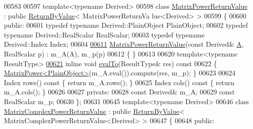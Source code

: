 \begin{DoxyCode}
00583 
00597 \textcolor{keyword}{template}<\textcolor{keyword}{typename} Derived>
00598 \textcolor{keyword}{class }\hyperlink{class_eigen_1_1_matrix_power_return_value}{MatrixPowerReturnValue} : \textcolor{keyword}{public} \hyperlink{group___core___module_class_eigen_1_1_return_by_value}{ReturnByValue}< MatrixPowerReturnVa
      lue<Derived> >
00599 \{
00600   \textcolor{keyword}{public}:
00601     \textcolor{keyword}{typedef} \textcolor{keyword}{typename} Derived::PlainObject PlainObject;
00602     \textcolor{keyword}{typedef} \textcolor{keyword}{typename} Derived::RealScalar RealScalar;
00603     \textcolor{keyword}{typedef} \textcolor{keyword}{typename} Derived::Index Index;
00604 
\hyperlink{class_eigen_1_1_matrix_power_return_value_a3067e09b352f967a23bb2a9c50afee88}{00611}     \hyperlink{class_eigen_1_1_matrix_power_return_value_a3067e09b352f967a23bb2a9c50afee88}{MatrixPowerReturnValue}(\textcolor{keyword}{const} Derived& \hyperlink{group___core___module_class_eigen_1_1_matrix}{A}, RealScalar p) : m\_A(A), m\_p(p)
00612     \{ \}
00613 
00620     \textcolor{keyword}{template}<\textcolor{keyword}{typename} ResultType>
\hyperlink{class_eigen_1_1_matrix_power_return_value_acdef58da9a4bcd2ec70260e73ce31973}{00621}     \textcolor{keyword}{inline} \textcolor{keywordtype}{void} \hyperlink{class_eigen_1_1_matrix_power_return_value_acdef58da9a4bcd2ec70260e73ce31973}{evalTo}(ResultType& res)\textcolor{keyword}{ const}
00622 \textcolor{keyword}{    }\{ \hyperlink{class_eigen_1_1_matrix_power}{MatrixPower<PlainObject>}(m\_A.eval()).compute(res, m\_p); \}
00623 
00624     Index rows()\textcolor{keyword}{ const }\{ \textcolor{keywordflow}{return} m\_A.rows(); \}
00625     Index cols()\textcolor{keyword}{ const }\{ \textcolor{keywordflow}{return} m\_A.cols(); \}
00626 
00627   \textcolor{keyword}{private}:
00628     \textcolor{keyword}{const} Derived& m\_A;
00629     \textcolor{keyword}{const} RealScalar m\_p;
00630 \};
00631 
00645 \textcolor{keyword}{template}<\textcolor{keyword}{typename} Derived>
00646 \textcolor{keyword}{class }\hyperlink{class_eigen_1_1_matrix_complex_power_return_value}{MatrixComplexPowerReturnValue} : \textcolor{keyword}{public} 
      \hyperlink{group___core___module_class_eigen_1_1_return_by_value}{ReturnByValue}< MatrixComplexPowerReturnValue<Derived> >
00647 \{
00648   \textcolor{keyword}{public}:

\end{DoxyCode}
